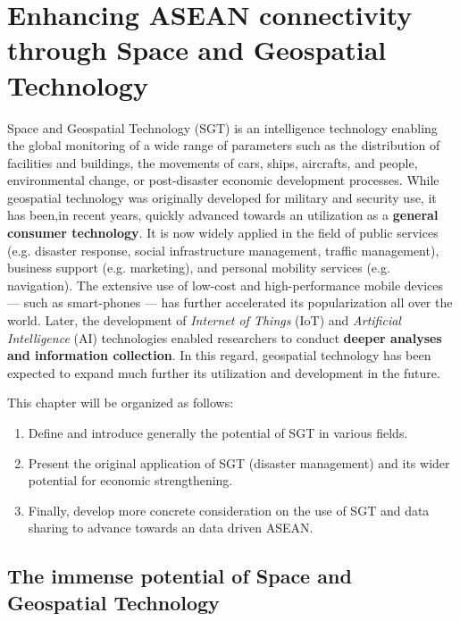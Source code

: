 \chapter{Enhancing ASEAN connectivity through Space and Geospatial Technology} \label{enhancing}

\tab Space and Geospatial Technology (SGT) is an intelligence technology enabling the global monitoring of a wide range of parameters such as the distribution of facilities and buildings, the movements of cars, ships, aircrafts, and people, environmental change, or post-disaster economic development processes. While geospatial technology was originally developed for military and security use, it has been,in recent years, quickly advanced towards an utilization as a \textbf{general consumer technology}. It is now widely applied in the field of public services (e.g. disaster response, social infrastructure management, traffic management), business support (e.g. marketing), and personal mobility services (e.g. navigation). The extensive use of low-cost and high-performance mobile devices --- such as smart-phones --- has further accelerated its popularization all over the world. Later, the development of \textit{Internet of Things} (IoT) and \textit{Artificial Intelligence} (AI) technologies enabled researchers to conduct \textbf{deeper analyses and information collection}. In this regard, geospatial technology has been expected to expand much further its utilization and development in the future.

\vspace{0.4 cm}

This chapter will be organized as follows:

\begin{enumerate}

\item Define and introduce generally the potential of SGT in various fields.

\item Present the original application of SGT (disaster management) and its wider potential for economic strengthening.

\item Finally, develop more concrete consideration on the use of SGT and data sharing to advance towards an data driven ASEAN.

\end{enumerate}


\section{The immense potential of Space and Geospatial Technology}

